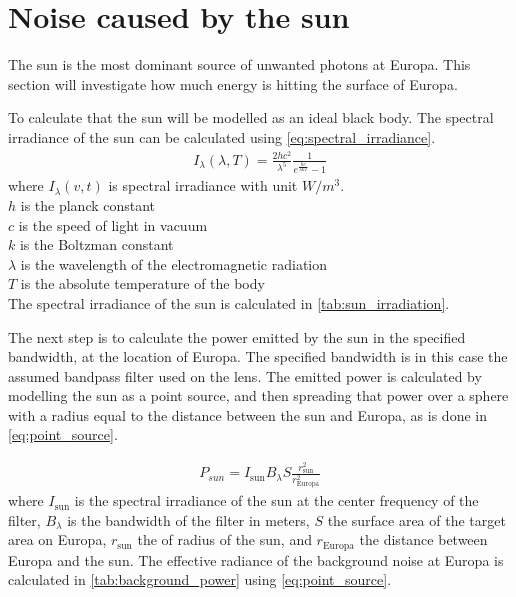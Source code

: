 \section{Noise caused by the sun}\label{ssec:background_noise}
The sun is the most dominant source of unwanted photons at Europa. This section will investigate how much energy is hitting the surface of Europa. 

To calculate that the sun will be modelled as an ideal black body. The spectral irradiance of the sun can be calculated using \cref{eq:spectral_irradiance}.
\begin{align}\label{eq:spectral_irradiance}
I_\lambda(\lambda,T) = \frac{2hc^2}{\lambda^5}\frac{1}{e^{\frac{hc}{\lambda kT}}-1}
\end{align}
where $I_\lambda(v,t)$ is spectral irradiance with unit $W/m^3$. \\
$h$ is the planck constant\\
$c$ is the speed of light in vacuum \\
$k$ is the Boltzman constant \\
$\lambda$ is the wavelength of the electromagnetic radiation\\
$T$ is the absolute temperature of the body\\



The spectral irradiance of the sun is calculated in \cref{tab:sun_irradiation}.



The next step is to calculate the power emitted by the sun in the specified bandwidth, at the location of Europa. The specified bandwidth is in this case the assumed bandpass filter used on the lens. The emitted power is calculated by modelling the sun as a point source, and then spreading that power over a sphere with a radius equal to the distance between the sun and Europa, as is done in \cref{eq:point_source}.

\begin{align}\label{eq:point_source}
    P_{sun} = I_{\text{sun}} B_\lambda S \frac{r_{\text{sun}}^2}{r_{\text{Europa}}^2}
\end{align}
where $I_{\text{sun}}$ is the spectral irradiance of the sun at the center frequency of the filter, $B_\lambda$ is the bandwidth of the filter in meters, $S$ the surface area of the target area on Europa, $r_{\text{sun}}$ the of radius of the sun, and $r_{\text{Europa}}$ the distance between Europa and the sun. The effective radiance of the background noise at Europa is calculated in \cref{tab:background_power} using \cref{eq:point_source}.

